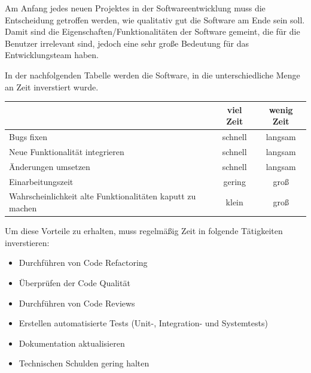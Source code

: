

    Am Anfang jedes neuen Projektes in der Softwareentwicklung muss die Entscheidung getroffen werden, wie qualitativ gut die Software am Ende sein soll.
    Damit sind die Eigenschaften/Funktionalitäten der Software gemeint, die für die Benutzer irrelevant sind, jedoch eine sehr große Bedeutung 
    für das Entwicklungsteam haben.
    
    In der nachfolgenden Tabelle werden die Software, in die unterschiedliche Menge an Zeit inverstiert wurde.

    \begin{tabular}{ |l|c|c| } 
        \hline
                                                                & viel Zeit & wenig Zeit \\ 
                                                                \hline
        Bugs fixen                                              & schnell       & langsam \\ 
        Neue Funktionalität integrieren                         & schnell       & langsam \\
        Änderungen umsetzen                                     & schnell       & langsam \\ 
        Einarbeitungszeit                                       & gering        & groß \\
        Wahrscheinlichkeit alte Funktionalitäten kaputt zu machen & klein       & groß \\
        \hline
       \end{tabular}


    Um diese Vorteile zu erhalten, muss regelmäßig Zeit in folgende Tätigkeiten inverstieren:
    \begin{itemize}
        \item Durchführen von Code Refactoring
        \item Überprüfen der Code Qualität
        \item Durchführen von Code Reviews
        \item Erstellen automatisierte Tests (Unit-, Integration- und Systemtests)
        \item Dokumentation aktualisieren
        \item Technischen Schulden gering halten
    \end{itemize}

